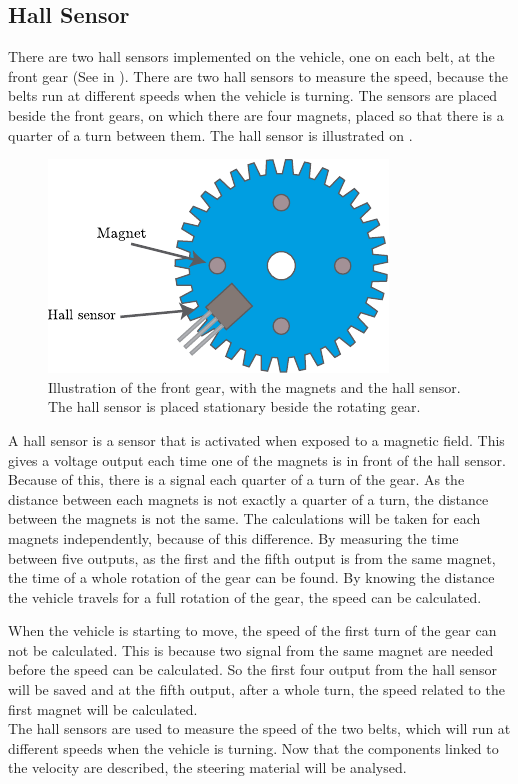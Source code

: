 \subsection{Hall Sensor}
There are two hall sensors implemented on the vehicle, one on each belt, at the front gear (See  in ). There are two hall sensors to measure the speed, because the belts run at different speeds when the vehicle is turning. The sensors are placed beside the front gears, on which there are four magnets, placed so that there is a quarter of a turn between them. The hall sensor is illustrated on .

 \begin{figure}[H]
	\centering
	\includegraphics[scale=1.2]{figures/hallSensorDrawing.pdf}
	\caption{Illustration of the front gear, with the magnets and the hall sensor. The hall sensor is placed stationary beside the rotating gear\cite{KHSoerensen}.}
	\label{HallSensor}
\end{figure}

A hall sensor is a sensor that is activated when exposed to a magnetic field. This gives a voltage output each time one of the magnets is in front of the hall sensor. Because of this, there is a signal each quarter of a turn of the gear. As the distance between each magnets is not exactly a quarter of a turn, the distance between the magnets is not the same. The calculations will be taken for each magnets independently, because of this difference.
By measuring the time between five outputs, as the first and the fifth output is from the same magnet, the time of a whole rotation of the gear can be found. By knowing the distance the vehicle travels for a full rotation of the gear, the speed can be calculated.

When the vehicle is starting to move, the speed of the first turn of the gear can not be calculated. This is because two signal from the same magnet are needed before the speed can be calculated. So the first four output from the hall sensor will be saved and at the fifth output, after a whole turn, the speed related to the first magnet will be calculated.\\

The hall sensors are used to measure the speed of the two belts, which will run at different speeds when the vehicle is turning. Now that the components linked to the velocity  are described, the steering material will be analysed.
